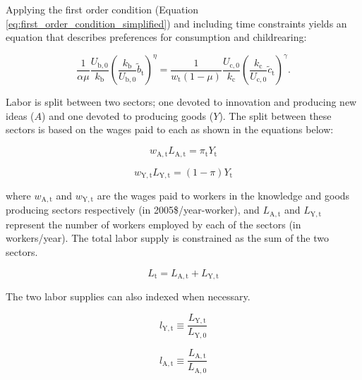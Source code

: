 \documentclass[letterpaper,12pt]{article}
\begin{document}
Applying the first order condition (Equation \ref{eq:first_order_condition_simplified}) and including time constraints yields an equation that describes preferences for consumption and childrearing:

\begin{equation} \label{eq:FOC_and_time_constraints}
	\frac{1}{\alpha \mu} \frac{U_\mathrm{b,0}}{k_\mathrm{b}} \left( \frac{k_\mathrm{b}}{U_\mathrm{b,0}} \tilde b_\mathrm{t} \right) ^{\eta} 
	= \frac{1}{w_\mathrm{t}(1-\mu)} \frac{U_\mathrm{c,0}}{k_\mathrm{c}}  \left( \frac{k_\mathrm{c}}{U_\mathrm{c,0}} \tilde c_\mathrm{t} \right)^\gamma .
\end{equation}

Labor is split between two sectors; one devoted to innovation and producing new ideas ($A$) and one devoted to producing goods ($Y$). The split between these sectors is based on the wages paid to each as shown in the equations below:

\begin{equation} \label{eq:knowledge_comp}
	w_\mathrm{A,t} L_\mathrm{A,t} = \pi_\mathrm{t} Y_\mathrm{t}
\end{equation}

\begin{equation} \label{eq:labor_comp}
	w_\mathrm{Y,t} L_\mathrm{Y,t} = (1-\pi) Y_\mathrm{t}
\end{equation}

\noindent where $w_\mathrm{A,t}$ and $w_\mathrm{Y,t}$ are the wages paid to workers in the knowledge and goods producing sectors respectively (in 2005\$/year-worker), and $L_\mathrm{A,t}$ and $L_\mathrm{Y,t}$ represent the number of workers employed by each of the sectors (in workers/year). The total labor supply is constrained as the sum of the two sectors.

\begin{equation} \label{eq: labor_supply}
	L_\mathrm{t} = L_\mathrm{A,t} + L_\mathrm{Y,t}
\end{equation}

The two labor supplies can also indexed when necessary.

\begin{equation}
	l_\mathrm{Y,t} \equiv \frac{L_\mathrm{Y,t}}{L_\mathrm{Y,0}}
\end{equation}

\begin{equation}
	l_\mathrm{A,t} \equiv \frac{L_\mathrm{A,t}}{L_\mathrm{A,0}}
\end{equation}
\end{document}
